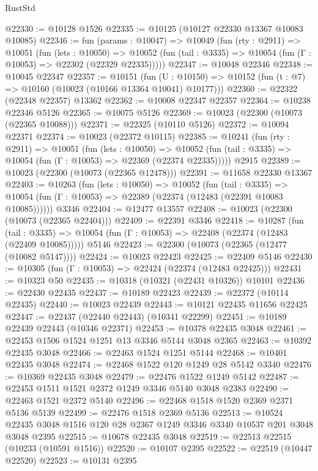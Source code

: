 \begin{lexlean}{RustStd}
\begin{coremodule}
@22330 := @10128 @1526
@22335 := @10125 (@10127 @22330 @13367 @10083 @10085)
@22346 := fun (params : @10047) =>
  @10049
    (fun (rty : @2911) =>
    @10051
      (fun (lets : @10050) =>
      @10052 (fun (tail : @3335) => @10054 (fun (Γ : @10053) => @22302 (@22329 @22335)))))
@22347 := @10048 @22346
@22348 := @10045 @22347
@22357 := @10151
    (fun (U : @10150) => @10152 (fun (t : @7) => @10160 (@10023 (@10166 @13364 @10041) @10177)))
@22360 := @22322 (@22348 @22357) @13362
@22362 := @10008 @22347 @22357
@22364 := @10238 @22346 @5126
@22365 := @10075 @5126
@22369 := @10023 (@22300 (@10073 (@22365 @10088)))
@22371 := @22325 (@10110 @5126)
@22372 := @10094 @22371
@22374 := @10023 (@22372 @10115)
@22385 := @10241
    (fun (rty : @2911) =>
    @10051
      (fun (lets : @10050) =>
      @10052 (fun (tail : @3335) => @10054 (fun (Γ : @10053) => @22369 (@22374 @22335)))))
    @2915
@22389 := @10023 (@22300 (@10073 (@22365 @12478)))
@22391 := @11658 @22330 @13367
@22403 := @10263
    (fun (lets : @10050) =>
    @10052
      (fun (tail : @3335) =>
      @10054 (fun (Γ : @10053) => @22389 (@22374 (@12483 (@22391 @10083 @10085))))))
    @3346
@22404 := @12477 @13557
@22408 := @10023 (@22300 (@10073 (@22365 @22404)))
@22409 := @22391 @3346
@22418 := @10287
    (fun (tail : @3335) => @10054 (fun (Γ : @10053) => @22408 (@22374 (@12483 (@22409 @10085)))))
    @5146
@22423 := @22300 (@10073 (@22365 (@12477 (@10082 @5147))))
@22424 := @10023 @22423
@22425 := @22409 @5146
@22430 := @10305 (fun (Γ : @10053) => @22424 (@22374 (@12483 @22425)))
@22431 := @10323 @50
@22435 := @10318 (@10321 (@22431 @10326)) @10101
@22436 := @22430 @22435
@22437 := @10189 @22423
@22439 := @22372 (@10114 @22435)
@22440 := @10023 @22439
@22443 := @10121 @22435 @11656 @22425
@22447 := @22437 (@22440 @22443) (@10341 @22299)
@22451 := @10189 @22439 @22443 (@10346 @22371)
@22453 := @10378 @22435 @3048
@22461 := @22453 @1506 @1524 @1251 @13 @3346 @5144 @3048 @2365
@22463 := @10392 @22435 @3048
@22466 := @22463 @1524 @1251 @5144
@22468 := @10401 @22435 @3048
@22474 := @22468 @1522 @120 @1249 @28 @5142 @3340
@22476 := @10369 @22435 @3048
@22479 := @22476 @1522 @1249 @5142
@22487 := @22453 @1511 @1521 @2372 @1249 @3346 @5140 @3048 @2383
@22490 := @22463 @1521 @2372 @5140
@22496 := @22468 @1518 @1520 @2369 @2371 @5136 @5139
@22499 := @22476 @1518 @2369 @5136
@22513 := @10524 @22435 @3048 @1516 @120 @28 @2367 @1249 @3346 @3340 @10537 @201 @3048 @3048 @2395
@22515 := @10678 @22435 @3048
@22519 := @22513 @22515 (@10233 (@10591 @1516))
@22520 := @10107 @2395
@22522 := @22519 (@10447 @22520)
@22523 := @10131 @2395

\end{coremodule}
\end{lexlean}
